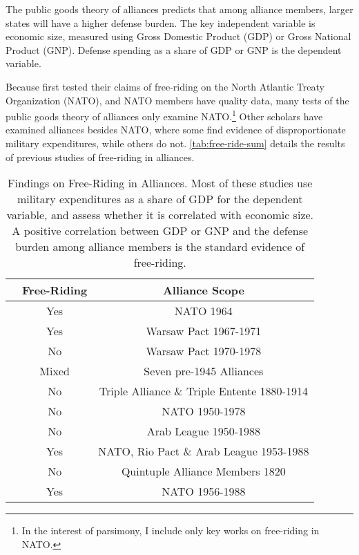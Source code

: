 \documentclass[12pt]{article}
\begin{document}
The public goods theory of alliances predicts that among alliance members, larger states will have a higher defense burden. 
The key independent variable is economic size, measured using Gross Domestic Product (GDP) or Gross National Product (GNP). 
Defense spending as a share of GDP or GNP is the dependent variable. 


Because \citet{OlsonZeckhauser1966} first tested their claims of free-riding on the North Atlantic Treaty Organization (NATO), and NATO members have quality data, many tests of the public goods theory of alliances only examine NATO.\footnote{In the interest of parsimony, I include only key works on free-riding in NATO.}
Other scholars have examined alliances besides NATO, where some find evidence of disproportionate military expenditures, while others do not. 
\autoref{tab:free-ride-sum} details the results of previous studies of free-riding in alliances. 


\begin{table}[hbt]
\begin{tabular}{lcc}
  & Free-Riding & Alliance Scope \\
\hline
\citet{OlsonZeckhauser1966} & Yes  & NATO 1964 \\
\citet{Starr1974} & Yes & Warsaw Pact 1967-1971 \\
\citet{Reisinger1983} & No & Warsaw Pact 1970-1978 \\
\citet{Thies1987} & Mixed & Seven pre-1945 Alliances \\ 
\citet{ConybeareSandler1990} & No & Triple Alliance \& Triple Entente 1880-1914 \\
\citet{Palmer1990} & No & NATO 1950-1978 \\
\citet{Chenetal1996} & No & Arab League 1950-1988 \\
\citet{OnealWhatley1996} & Yes & NATO, Rio Pact \& Arab League 1953-1988 \\
\citet{Siroky2012} & No & Quintuple Alliance Members 1820 \\
\citet{PluemperNeumayer2015} & Yes & NATO 1956-1988 \\
\hline 
\end{tabular}
\caption{Findings on Free-Riding in Alliances. Most of these studies use military expenditures as a share of GDP for the dependent variable, and assess whether it is correlated with economic size. A positive correlation between GDP or GNP and the defense burden among alliance members is the standard evidence of free-riding.}
\label{tab:free-ride-sum}
\end{table}
\end{document}
